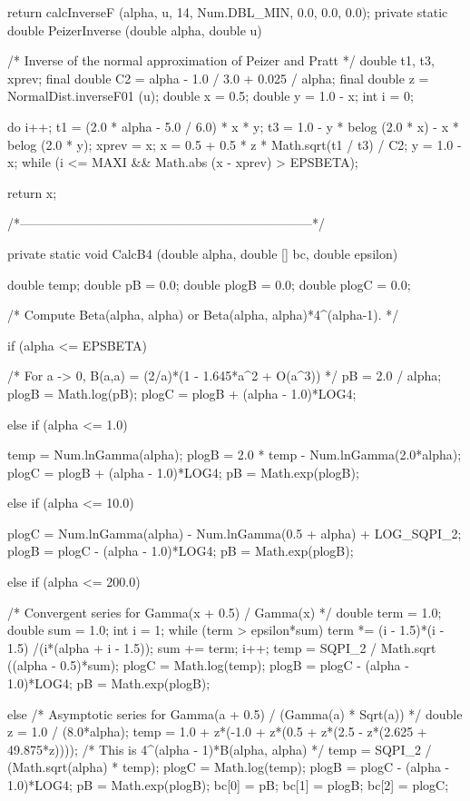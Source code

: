 \begin{code}
\begin{hide} {
      return calcInverseF (alpha, u, 14, Num.DBL_MIN, 0.0, 0.0, 0.0);
   }
   private static double PeizerInverse (double alpha, double u)
   {
      /* Inverse of the normal approximation of Peizer and Pratt */
      double t1, t3, xprev;
      final double C2 = alpha - 1.0 / 3.0 + 0.025 / alpha;
      final double z = NormalDist.inverseF01 (u);
      double x = 0.5;
      double y = 1.0 - x;
      int i = 0;

      do {
         i++;
         t1 = (2.0 * alpha - 5.0 / 6.0) * x * y;
         t3 = 1.0 - y * belog (2.0 * x) - x * belog (2.0 * y);
         xprev = x;
         x = 0.5 + 0.5 * z * Math.sqrt(t1 / t3) / C2;
         y = 1.0 - x;
      } while (i <= MAXI && Math.abs (x - xprev) > EPSBETA);

      return x;
   }

   /*---------------------------------------------------------------------*/

   private static void CalcB4 (double alpha, double [] bc, double epsilon)
   {
      double temp;
      double pB = 0.0;
      double plogB = 0.0;
      double plogC = 0.0;

      /* Compute Beta(alpha, alpha) or Beta(alpha, alpha)*4^(alpha-1). */

      if (alpha <= EPSBETA) {
         /* For a -> 0, B(a,a) = (2/a)*(1 - 1.645*a^2 + O(a^3)) */
         pB = 2.0 / alpha;
	      plogB = Math.log(pB);
         plogC = plogB + (alpha - 1.0)*LOG4;

      } else if (alpha <= 1.0) {
         temp = Num.lnGamma(alpha);
	      plogB = 2.0 * temp - Num.lnGamma(2.0*alpha);
         plogC = plogB + (alpha - 1.0)*LOG4;
         pB = Math.exp(plogB);

      } else if (alpha <= 10.0) {
         plogC = Num.lnGamma(alpha) - Num.lnGamma(0.5 + alpha) + LOG_SQPI_2;
         plogB = plogC - (alpha - 1.0)*LOG4;
         pB = Math.exp(plogB);

      } else if (alpha <= 200.0) {
         /* Convergent series for Gamma(x + 0.5) / Gamma(x) */
         double term = 1.0;
         double sum = 1.0;
         int i = 1;
         while (term > epsilon*sum) {
            term *= (i - 1.5)*(i - 1.5) /(i*(alpha + i - 1.5));
            sum += term;
            i++;
         }
         temp = SQPI_2 / Math.sqrt ((alpha - 0.5)*sum);
         plogC = Math.log(temp);
         plogB = plogC - (alpha - 1.0)*LOG4;
         pB = Math.exp(plogB);

      } else {
         /* Asymptotic series for Gamma(a + 0.5) / (Gamma(a) * Sqrt(a)) */
         double z = 1.0 / (8.0*alpha);
         temp = 1.0 + z*(-1.0 + z*(0.5 + z*(2.5 - z*(2.625 + 49.875*z))));
         /* This is 4^(alpha - 1)*B(alpha, alpha) */
         temp = SQPI_2 / (Math.sqrt(alpha) * temp);
         plogC = Math.log(temp);
         plogB = plogC - (alpha - 1.0)*LOG4;
         pB = Math.exp(plogB);
      }
      bc[0] = pB;
      bc[1] = plogB;
      bc[2] = plogC;
   }


\end{hide}
\end{code}
